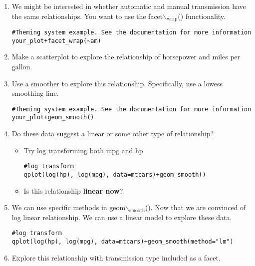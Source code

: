 \documentclass[11pt]{article}
\begin{document}
\begin{enumerate}
\item We might be interested in whether automatic and manual transmission have the same relationships. You want to use the facet$\backslash$\(_{\text{wrap}}\)() functionality. 

\lstset{language=R,label= ,caption= ,captionpos=b,numbers=none}
\begin{lstlisting}
#Theming system example. See the documentation for more information
your_plot+facet_wrap(~am)
\end{lstlisting}

\item Make a scatterplot to explore the relationship of horsepower and miles per gallon.

\item Use a smoother to explore this relationship. Specifically, use a lowess smoothing line.

\lstset{language=R,label= ,caption= ,captionpos=b,numbers=none}
\begin{lstlisting}
#Theming system example. See the documentation for more information
your_plot+geom_smooth()
\end{lstlisting}

\item Do these data suggest a linear or some other type of relationship? 
\begin{itemize}
\item Try log transforming both mpg and hp

\lstset{language=R,label= ,caption= ,captionpos=b,numbers=none}
\begin{lstlisting}
#log transform
qplot(log(hp), log(mpg), data=mtcars)+geom_smooth()
\end{lstlisting}

\item Is this relationship \textbf{linear now}?
\end{itemize}

\item We can use specific methods in geom$\backslash$\(_{\text{smooth}}\)(). Now that we are convinced of log linear relationship. We can use a linear model to explore these data.

\lstset{language=R,label= ,caption= ,captionpos=b,numbers=none}
\begin{lstlisting}
#log transform
qplot(log(hp), log(mpg), data=mtcars)+geom_smooth(method="lm")
\end{lstlisting}

\item Explore this relationship with transmission type included as a facet.


\end{enumerate}
\end{document}
